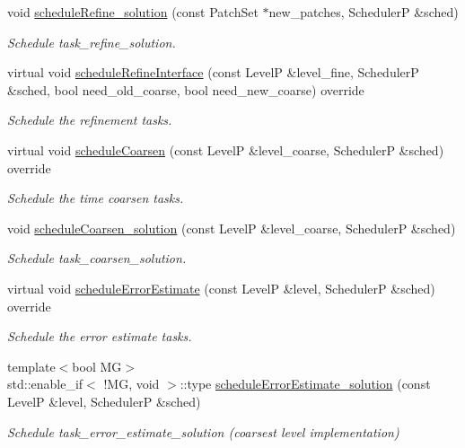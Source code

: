 \begin{DoxyCompactItemize}
void \hyperlink{classUintah_1_1PhaseField_1_1Heat_a49c2b810f24594c25735da508deea0f7}{schedule\+Refine\+\_\+solution} (const Patch\+Set $\ast$new\+\_\+patches, SchedulerP \&sched)
\begin{DoxyCompactList}\small\item\em Schedule task\+\_\+refine\+\_\+solution. \end{DoxyCompactList}\item 
virtual void \hyperlink{classUintah_1_1PhaseField_1_1Heat_a0897d2ac6114e763ec9d832100824faf}{schedule\+Refine\+Interface} (const LevelP \&level\+\_\+fine, SchedulerP \&sched, bool need\+\_\+old\+\_\+coarse, bool need\+\_\+new\+\_\+coarse) override
\begin{DoxyCompactList}\small\item\em Schedule the refinement tasks. \end{DoxyCompactList}\item 
virtual void \hyperlink{classUintah_1_1PhaseField_1_1Heat_a32444a0c898306328d5f2f28f7acb59c}{schedule\+Coarsen} (const LevelP \&level\+\_\+coarse, SchedulerP \&sched) override
\begin{DoxyCompactList}\small\item\em Schedule the time coarsen tasks. \end{DoxyCompactList}\item 
void \hyperlink{classUintah_1_1PhaseField_1_1Heat_affbdc737418eacaee32fdf7adba3a856}{schedule\+Coarsen\+\_\+solution} (const LevelP \&level\+\_\+coarse, SchedulerP \&sched)
\begin{DoxyCompactList}\small\item\em Schedule task\+\_\+coarsen\+\_\+solution. \end{DoxyCompactList}\item 
virtual void \hyperlink{classUintah_1_1PhaseField_1_1Heat_af7b0ce1990eeca4e11e3c65ce57dac8f}{schedule\+Error\+Estimate} (const LevelP \&level, SchedulerP \&sched) override
\begin{DoxyCompactList}\small\item\em Schedule the error estimate tasks. \end{DoxyCompactList}\item 
{\footnotesize template$<$bool MG$>$ }\\std\+::enable\+\_\+if$<$ !MG, void $>$\+::type \hyperlink{classUintah_1_1PhaseField_1_1Heat_a409db9828b044c7f8aec3b9833239678}{schedule\+Error\+Estimate\+\_\+solution} (const LevelP \&level, SchedulerP \&sched)
\begin{DoxyCompactList}\small\item\em Schedule task\+\_\+error\+\_\+estimate\+\_\+solution (coarsest level implementation) \end{DoxyCompactList}\item 

\end{DoxyCompactItemize}
